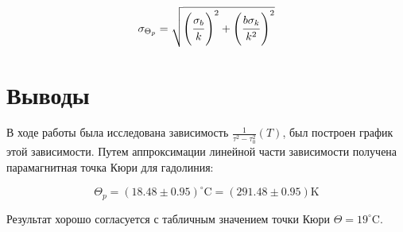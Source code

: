 \documentclass[12pt,a4paper]{scrartcl}
\begin{document}
	$$\sigma_{\Theta_p} = \sqrt{\left(\dfrac{\strut \sigma_b}{\strut k}\right)^2 + \left(\dfrac{\strut b\sigma_k}{\strut k^2}\right)^2}$$
	
	\section{Выводы}
	
	В ходе работы была исследована зависимость $\frac{1}{\tau^2 - \tau_0^2}(T)$, был построен график этой зависимости. Путем аппроксимации линейной части зависимости получена парамагнитная точка Кюри для гадолиния:
	
	$$\Theta_p = (18.48 \pm 0.95) ^\circ \mathrm{C} = (291.48 \pm 0.95) \mathrm{K}$$
	
	Результат хорошо согласуется с табличным значением точки Кюри $\Theta = 19 ^\circ \mathrm{C}$.
	
\end{document}

